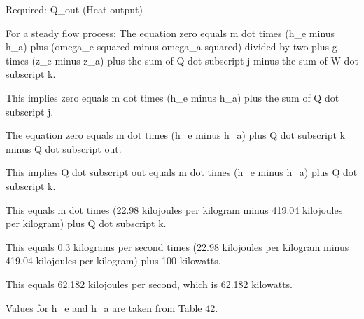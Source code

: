 Required: Q_out (Heat output)

For a steady flow process:
The equation zero equals m dot times (h_e minus h_a) plus (omega_e squared minus omega_a squared) divided by two plus g times (z_e minus z_a) plus the sum of Q dot subscript j minus the sum of W dot subscript k.

This implies zero equals m dot times (h_e minus h_a) plus the sum of Q dot subscript j.

The equation zero equals m dot times (h_e minus h_a) plus Q dot subscript k minus Q dot subscript out.

This implies Q dot subscript out equals m dot times (h_e minus h_a) plus Q dot subscript k.

This equals m dot times (22.98 kilojoules per kilogram minus 419.04 kilojoules per kilogram) plus Q dot subscript k.

This equals 0.3 kilograms per second times (22.98 kilojoules per kilogram minus 419.04 kilojoules per kilogram) plus 100 kilowatts.

This equals 62.182 kilojoules per second, which is 62.182 kilowatts.

Values for h_e and h_a are taken from Table 42.